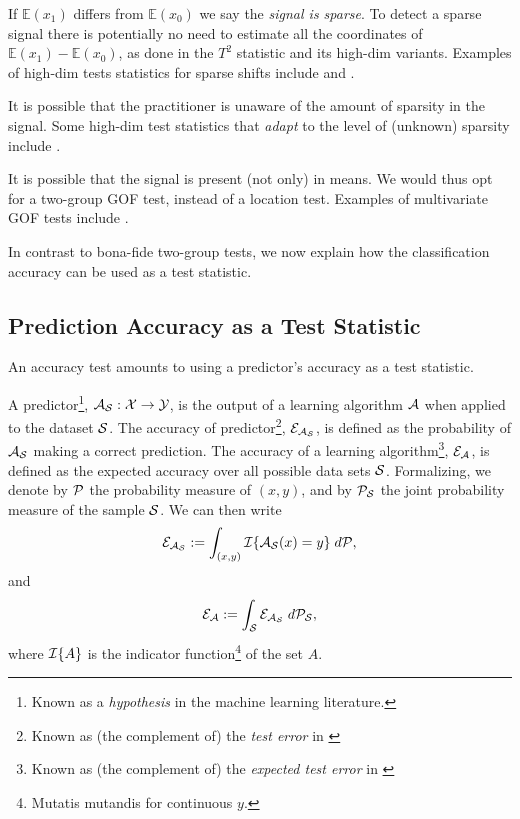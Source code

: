 \documentclass[journal]{IEEEtran}
\begin{document}
If $\mathbb{E}(x_1)$ differs from $\mathbb{E}(x_0)$ we say the \emph{signal is sparse}.
To detect a sparse signal there is potentially no need to estimate all the coordinates of $\mathbb{E}(x_1)-\mathbb{E}(x_0)$, as done in the $T^2$ statistic and its high-dim variants. 
Examples of high-dim tests statistics for sparse shifts include \cite{cai_two-sample_2013} and \cite{chang2014simulation}.

It is possible that the practitioner is unaware of the amount of sparsity in the signal. 
Some high-dim test statistics that \emph{adapt} to the level of (unknown) sparsity include \cite{simes1986improved,donoho2004higher,zhong2013tests,shen2015adaptive,moscovich2016exact}.

It is possible that the signal is present (not only) in means. 
We would thus opt for a two-group GOF test, instead of a location test. 
Examples of multivariate GOF tests include \cite{bickel1969distribution,friedman1979multivariate,hall2002permutation,szekely2004testing,Biau2005,Rosenbaum2005,eric2008testing,perez2009estimation,vayatis_auc_2009,gretton_kernel_2012-1}.

In contrast to bona-fide two-group tests, we now explain how the classification accuracy can be used as a test statistic.

\subsection{Prediction Accuracy as a Test Statistic}
An accuracy test amounts to using a predictor's accuracy as a test statistic.  

A predictor\footnote{Known as a \emph{hypothesis} in the machine learning literature.}, $\mathcal{A}_{\mathcal{S}}:\mathcal{X} \to \mathcal{Y}$, is the output of a learning algorithm $\mathcal{A}$ when applied to the dataset $\mathcal{S}$. 
The accuracy of predictor\footnote{Known as (the complement of) the \emph{test error} in \cite{hastie_elements_2003}}, $\mathcal{E}_{\mathcal{A}_{\mathcal{S}}}$, is defined as the probability of $\mathcal{A}_{\mathcal{S}}$ making a correct prediction. 
The accuracy of a learning algorithm\footnote{Known as (the complement of) the \emph{expected test error} in \cite{hastie_elements_2003}}, $\mathcal{E}_{\mathcal{A}}$, is defined as the expected accuracy over all possible data sets $\mathcal{S}$. 
Formalizing, we denote by $\mathcal{P}$ the probability measure of $(x, y)$, and by $\mathcal{P}_{\mathcal{S}}$ the joint probability measure of the sample $\mathcal{S}$. 
We can then write 
\begin{align}
\mathcal{E}_{\mathcal{A}_{\mathcal{S}}}:=\int_{(x,y)} \mathcal{I}{\{ \mathcal{A}_{\mathcal{S}}(x)=y \}} \; d\mathcal{P},
\end{align}
and
\begin{align}
\mathcal{E}_{\mathcal{A}}:=\int_{\mathcal{S}} \mathcal{E}_{\mathcal{A}_{\mathcal{S}}} \; d\mathcal{P}_{\mathcal{S}},
\end{align}
where $\mathcal{I}{\{ A \}}$ is the indicator function\footnote{Mutatis mutandis for continuous $y$.} of the set $A$. 
\end{document}

